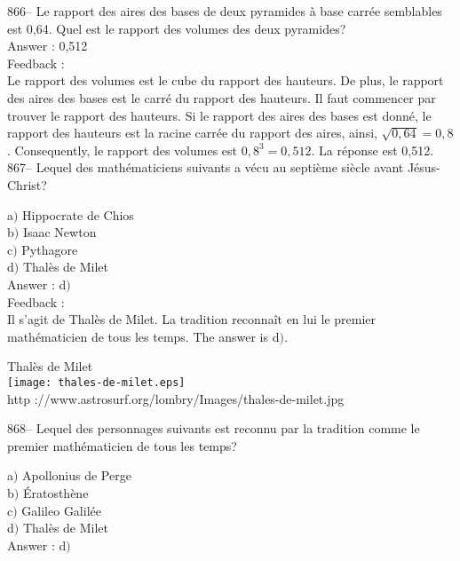 ﻿\documentclass[letterpaper, 12pt]{article}
\begin{document}
866-- Le rapport des aires des bases de deux pyramides \`a base carr\'ee
semblables est 0,64.  Quel est le rapport des volumes des deux pyramides?\\

Answer : 0,512\\

Feedback : \\
Le rapport des volumes est le cube du rapport des hauteurs.  De
plus, le rapport des aires des bases est le carr\'e du rapport des
hauteurs.  Il faut commencer par trouver le rapport des hauteurs.
Si le rapport des aires des bases est donn\'e, le rapport des
hauteurs est la racine carr\'ee du rapport des aires, ainsi,
$\sqrt{0,64}=0,8$.
Consequently, le rapport des volumes est $0,8^{3}=0,512$. La r\'eponse
est 0,512.\\


867-- Lequel des math\'ematiciens suivants a v\'ecu au septi\`eme
si\`ecle avant J\'esus-Christ?

a$)$ Hippocrate de Chios \\
b$)$ Isaac Newton \\
c$)$ Pythagore \\
d$)$ Thal\`es de Milet\\

Answer : d$)$\\

Feedback :\\
Il s'agit de Thal\`es de Milet. La tradition reconna\^it en lui le
premier math\'ematicien de tous les temps. The answer is
d$)$.

    \begin{center}
        Thal\`es de Milet\\
    \texttt{[image: thales-de-milet.eps]}\\
        {\footnotesize http
://www.astrosurf.org/lombry/Images/thales-de-milet.jpg}
    \end{center}

868-- Lequel des personnages suivants est reconnu par la tradition
comme le premier math\'ematicien de tous les temps?

a$)$ Apollonius de Perge \\
b$)$ \'Eratosth\`ene \\
c$)$ Galileo Galil\'ee \\
d$)$ Thal\`es de Milet \\

Answer : d$)$\\
\end{document}
